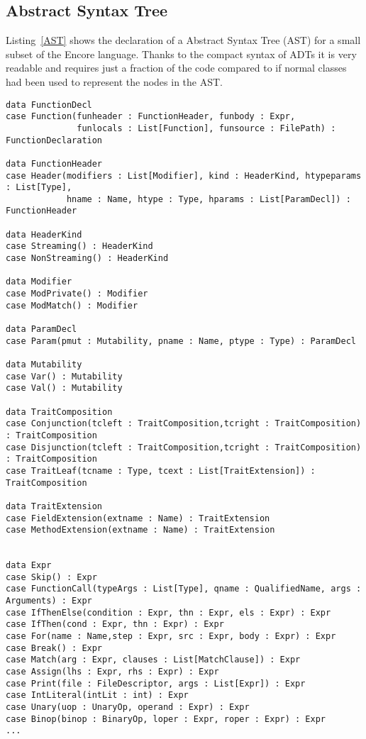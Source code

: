 \documentclass[10pt]{report}
\begin{document}
{\subsection{Abstract Syntax Tree}
\par{Listing~\ref{AST} shows the declaration of a Abstract Syntax Tree (AST) for a small subset of the Encore language. Thanks to the compact syntax of ADTs it is very readable and requires just a fraction of the code compared to if normal classes had been used to represent the nodes in the AST.}
\begin{lstlisting}[language=encore,caption={Abstract Syntax Tree with ADTs},label=AST]
data FunctionDecl
case Function(funheader : FunctionHeader, funbody : Expr,
              funlocals : List[Function], funsource : FilePath) : FunctionDeclaration

data FunctionHeader
case Header(modifiers : List[Modifier], kind : HeaderKind, htypeparams : List[Type],
            hname : Name, htype : Type, hparams : List[ParamDecl]) : FunctionHeader

data HeaderKind
case Streaming() : HeaderKind
case NonStreaming() : HeaderKind

data Modifier
case ModPrivate() : Modifier
case ModMatch() : Modifier

data ParamDecl
case Param(pmut : Mutability, pname : Name, ptype : Type) : ParamDecl

data Mutability
case Var() : Mutability
case Val() : Mutability

data TraitComposition
case Conjunction(tcleft : TraitComposition,tcright : TraitComposition) : TraitComposition
case Disjunction(tcleft : TraitComposition,tcright : TraitComposition) : TraitComposition
case TraitLeaf(tcname : Type, tcext : List[TraitExtension]) : TraitComposition

data TraitExtension
case FieldExtension(extname : Name) : TraitExtension
case MethodExtension(extname : Name) : TraitExtension


data Expr
case Skip() : Expr
case FunctionCall(typeArgs : List[Type], qname : QualifiedName, args : Arguments) : Expr
case IfThenElse(condition : Expr, thn : Expr, els : Expr) : Expr
case IfThen(cond : Expr, thn : Expr) : Expr
case For(name : Name,step : Expr, src : Expr, body : Expr) : Expr
case Break() : Expr
case Match(arg : Expr, clauses : List[MatchClause]) : Expr
case Assign(lhs : Expr, rhs : Expr) : Expr
case Print(file : FileDescriptor, args : List[Expr]) : Expr
case IntLiteral(intLit : int) : Expr
case Unary(uop : UnaryOp, operand : Expr) : Expr
case Binop(binop : BinaryOp, loper : Expr, roper : Expr) : Expr
...
\end{lstlisting}
}
\end{document}
